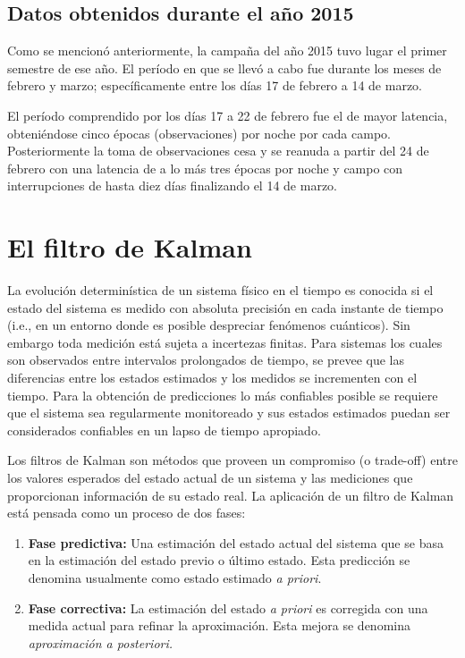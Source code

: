 \subsection{Datos obtenidos durante el a\~no 2015}\label{ssec:data}
Como se mencion\'o anteriormente, la campa\~na del a\~no 2015 tuvo lugar el primer semestre de ese a\~no. El per\'iodo en que se llev\'o a cabo fue durante los meses de febrero y marzo; espec\'ificamente entre los d\'ias 17 de febrero a 14 de marzo.
\bigskip

El per\'iodo comprendido por los d\'ias 17 a 22 de febrero fue el de mayor latencia, obteni\'endose cinco \'epocas (observaciones) por noche por cada campo. Posteriormente la toma de observaciones cesa y se reanuda a partir del 24 de febrero con una latencia de a lo m\'as tres \'epocas por noche y campo con interrupciones de hasta diez d\'ias finalizando el 14 de marzo.

\section{El filtro de Kalman}
La evoluci\'on determin\'istica de un sistema f\'isico en el tiempo es conocida si el estado del sistema es medido con absoluta precisi\'on en cada instante de tiempo (i.e., en un entorno donde es posible despreciar fen\'omenos cu\'anticos). Sin embargo toda medici\'on est\'a sujeta a incertezas finitas. Para sistemas los cuales son observados entre intervalos prolongados de tiempo, se prevee que las diferencias entre los estados estimados y los medidos se incrementen con el tiempo. Para la obtenci\'on de predicciones lo m\'as confiables posible se requiere que el sistema sea regularmente monitoreado y sus estados estimados puedan ser considerados confiables en un lapso de tiempo apropiado. 
\bigskip

Los filtros de Kalman son m\'etodos que proveen un compromiso (o trade-off) entre los valores esperados del estado actual de un sistema y las mediciones que proporcionan informaci\'on de su estado real. La aplicaci\'on de un filtro de Kalman est\'a pensada como un proceso de dos fases:
\begin{enumerate}
\item \textbf{Fase predictiva:} Una estimaci\'on del estado actual del sistema que se basa en la estimaci\'on del estado previo o \'ultimo estado. Esta predicci\'on se denomina usualmente como estado estimado \textit{a priori}. 
\item \textbf{Fase correctiva:} La estimaci\'on del estado \textit{a priori} es corregida con una medida actual para refinar la aproximaci\'on. Esta mejora se denomina \textit{aproximaci\'on a posteriori.}
\end{enumerate}


